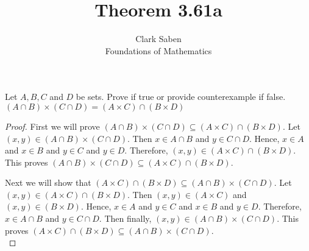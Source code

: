 \documentclass[12pt]{article}
\newenvironment{theorem}[2][Theorem]{\begin{trivlist}
\item[\hskip \labelsep {\bfseries #1}\hskip \labelsep {\bfseries #2.}]}{\end{trivlist}}
\begin{document}
 
 
\title{Theorem 3.61a}%
\author{Clark Saben\\ %
Foundations of Mathematics} %
 
\maketitle

 
\begin{theorem}{3.61 a}
	Let $A,B,C$ and $D$ be sets. Prove if true or provide counterexample if false. $(A \cap B) \times(C \cap D)=(A \times C) \cap(B \times D)$
\end{theorem}
 
\begin{proof}
	First we will prove $\left(A \cap B\right) \times\left(C \cap D\right) \subseteq \left(A \times C\right) \cap\left(B \times D\right)$.
	Let $\left(x,y \right) \in \left(A \cap B\right) \times\left(C \cap D\right)$.
	Then $x \in A \cap B$ and $y \in C \cap D$. Hence, $x \in A$ and $x \in B$ and $y \in C$ and $y \in D$. Therefore, $\left(x,y \right) \in \left(A \times C\right) \cap\left(B \times D\right)$.
	This proves $\left(A \cap B\right) \times\left(C \cap D\right) \subseteq \left(A \times C\right) \cap\left(B \times D\right)$.\\

	\par

	Next we will show that $\left(A \times C\right) \cap\left(B \times D\right) \subseteq \left(A \cap B\right) \times\left(C \cap D\right)$.
	Let $\left(x,y \right) \in \left(A \times C\right) \cap\left(B \times D\right)$.
	Then $\left(x,y \right) \in \left(A \times C\right)$ and $\left(x,y \right) \in \left(B \times D\right)$. Hence, $x \in A$ and $y \in C$ and $x \in B$ and $y \in D$. Therefore, $x \in A \cap B$ and $y \in C \cap D$. Then finally, $\left(x,y \right) \in \left(A \cap B\right) \times\left(C \cap D\right)$.
	This proves $\left(A \times C\right) \cap\left(B \times D\right) \subseteq \left(A \cap B\right) \times\left(C \cap D\right)$.\\

\end{proof}

    



 
 
\end{document}
